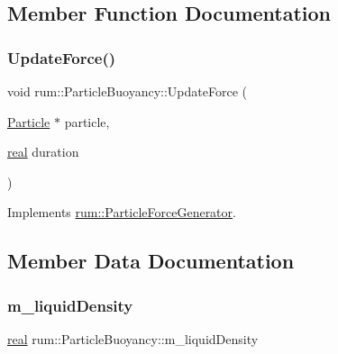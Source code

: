 \subsection{Member Function Documentation}
\mbox{\label{classrum_1_1_particle_buoyancy_aeda5d90f9ac512fdf63079739b9af0b7}} 
\subsubsection{\texorpdfstring{Update\+Force()}{UpdateForce()}}
{\footnotesize\ttfamily void rum\+::\+Particle\+Buoyancy\+::\+Update\+Force (\begin{DoxyParamCaption}\item[{\hyperlink{classrum_1_1_particle}{Particle} $\ast$}]{particle,  }\item[{\hyperlink{namespacerum_a7e8cca23573d5eaead0f138cbaa4862c}{real}}]{duration }\end{DoxyParamCaption})\hspace{0.3cm}{\ttfamily [virtual]}}



Implements \hyperlink{classrum_1_1_particle_force_generator_aca758295718deb8569796185ccbe8d54}{rum\+::\+Particle\+Force\+Generator}.



\subsection{Member Data Documentation}
\mbox{\label{classrum_1_1_particle_buoyancy_a8e347c9390d2eb5e4340f6e3c9d8d332}} 
\subsubsection{\texorpdfstring{m\+\_\+liquid\+Density}{m\_liquidDensity}}
{\footnotesize\ttfamily \hyperlink{namespacerum_a7e8cca23573d5eaead0f138cbaa4862c}{real} rum\+::\+Particle\+Buoyancy\+::m\+\_\+liquid\+Density\hspace{0.3cm}{\ttfamily [protected]}}

